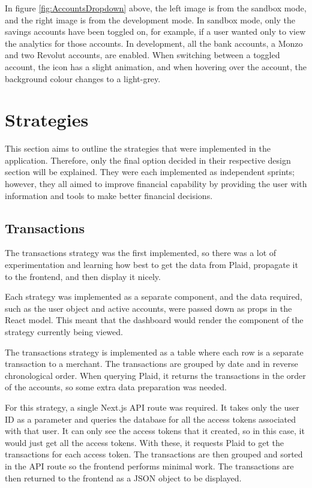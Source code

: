 In figure \ref{fig:AccountsDropdown} above, the left image is from the sandbox mode, and the right image is from the development mode. In sandbox mode, only the savings accounts have been toggled on, for example, if a user wanted only to view the analytics for those accounts. In development, all the bank accounts, a Monzo and two Revolut accounts, are enabled. When switching between a toggled account, the icon has a slight animation, and when hovering over the account, the background colour changes to a light-grey.


\section{Strategies}
This section aims to outline the strategies that were implemented in the application. Therefore, only the final option decided in their respective design section will be explained. They were each implemented as independent sprints; however, they all aimed to improve financial capability by providing the user with information and tools to make better financial decisions.

\subsection{Transactions}
The transactions strategy was the first implemented, so there was a lot of experimentation and learning how best to get the data from Plaid, propagate it to the frontend, and then display it nicely.

Each strategy was implemented as a separate component, and the data required, such as the user object and active accounts, were passed down as props in the React model. This meant that the dashboard would render the component of the strategy currently being viewed.

The transactions strategy is implemented as a table where each row is a separate transaction to a merchant. The transactions are grouped by date and in reverse chronological order. When querying Plaid, it returns the transactions in the order of the accounts, so some extra data preparation was needed.

For this strategy, a single Next.js API route was required. It takes only the user ID as a parameter and queries the database for all the access tokens associated with that user. It can only see the access tokens that it created, so in this case, it would just get all the access tokens. With these, it requests Plaid to get the transactions for each access token. The transactions are then grouped and sorted in the API route so the frontend performs minimal work. The transactions are then returned to the frontend as a JSON object to be displayed.

